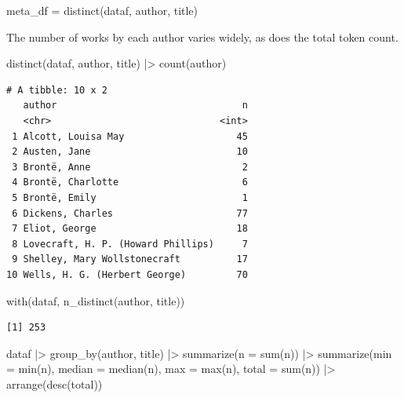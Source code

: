 \documentclass[
]{article}
\newenvironment{Shaded}{\begin{snugshade}}{\end{snugshade}}
\newcommand{\AttributeTok}[1]{\textcolor[rgb]{0.40,0.45,0.13}{#1}}
\newcommand{\FunctionTok}[1]{\textcolor[rgb]{0.28,0.35,0.67}{#1}}
\newcommand{\NormalTok}[1]{\textcolor[rgb]{0.00,0.23,0.31}{#1}}
\newcommand{\OtherTok}[1]{\textcolor[rgb]{0.00,0.23,0.31}{#1}}
\newcommand{\SpecialCharTok}[1]{\textcolor[rgb]{0.37,0.37,0.37}{#1}}
\begin{document}
\begin{Shaded}
\begin{Highlighting}[]
\NormalTok{meta\_df }\OtherTok{=} \FunctionTok{distinct}\NormalTok{(dataf, author, title)}
\end{Highlighting}
\end{Shaded}

The number of works by each author varies widely, as does the total
token count.

\begin{Shaded}
\begin{Highlighting}[]
\FunctionTok{distinct}\NormalTok{(dataf, author, title) }\SpecialCharTok{|\textgreater{}} 
    \FunctionTok{count}\NormalTok{(author)}
\end{Highlighting}
\end{Shaded}

\begin{verbatim}
# A tibble: 10 x 2
   author                                 n
   <chr>                              <int>
 1 Alcott, Louisa May                    45
 2 Austen, Jane                          10
 3 Brontë, Anne                           2
 4 Brontë, Charlotte                      6
 5 Brontë, Emily                          1
 6 Dickens, Charles                      77
 7 Eliot, George                         18
 8 Lovecraft, H. P. (Howard Phillips)     7
 9 Shelley, Mary Wollstonecraft          17
10 Wells, H. G. (Herbert George)         70
\end{verbatim}

\begin{Shaded}
\begin{Highlighting}[]
\FunctionTok{with}\NormalTok{(dataf, }\FunctionTok{n\_distinct}\NormalTok{(author, title))}
\end{Highlighting}
\end{Shaded}

\begin{verbatim}
[1] 253
\end{verbatim}

\begin{Shaded}
\begin{Highlighting}[]
\NormalTok{dataf }\SpecialCharTok{|\textgreater{}} 
    \FunctionTok{group\_by}\NormalTok{(author, title) }\SpecialCharTok{|\textgreater{}} 
    \FunctionTok{summarize}\NormalTok{(}\AttributeTok{n =} \FunctionTok{sum}\NormalTok{(n)) }\SpecialCharTok{|\textgreater{}} 
    \FunctionTok{summarize}\NormalTok{(}\AttributeTok{min =} \FunctionTok{min}\NormalTok{(n), }
              \AttributeTok{median =} \FunctionTok{median}\NormalTok{(n), }
              \AttributeTok{max =} \FunctionTok{max}\NormalTok{(n), }
              \AttributeTok{total =} \FunctionTok{sum}\NormalTok{(n)) }\SpecialCharTok{|\textgreater{}} 
    \FunctionTok{arrange}\NormalTok{(}\FunctionTok{desc}\NormalTok{(total))}
\end{Highlighting}
\end{Shaded}
\end{document}

